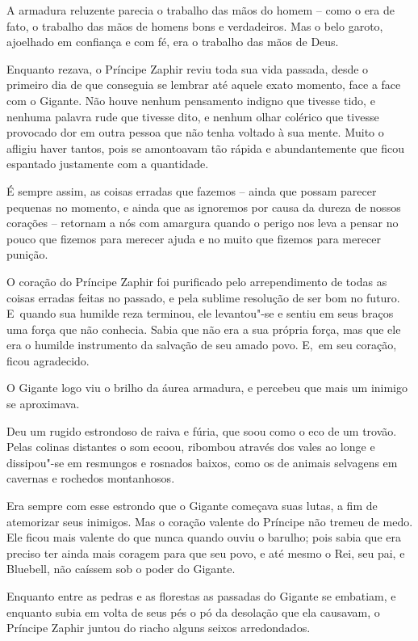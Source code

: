 A armadura reluzente parecia o trabalho das mãos do homem -- como o era de fato,
o trabalho das mãos de homens bons e verdadeiros. Mas o belo garoto,
ajoelhado em confiança e com fé, era o trabalho das mãos de Deus.

Enquanto rezava, o Príncipe Zaphir reviu toda sua vida passada, desde o
primeiro dia de que conseguia se lembrar até aquele exato momento, face
a face com o Gigante. Não houve nenhum pensamento indigno que tivesse
tido, e nenhuma palavra rude que tivesse dito, e nenhum olhar colérico
que tivesse provocado dor em outra pessoa que não tenha voltado à sua
mente. Muito o afligiu haver tantos, pois se amontoavam tão rápida e
abundantemente que ficou espantado justamente com a quantidade.

É sempre assim, as coisas erradas que fazemos -- ainda que possam
parecer pequenas no momento, e ainda que as ignoremos por causa da
dureza de nossos corações -- retornam a nós com amargura quando o
perigo nos leva a pensar no pouco que fizemos para merecer ajuda e no
muito que fizemos para merecer punição.

O coração do Príncipe Zaphir foi purificado pelo arrependimento de todas
as coisas erradas feitas no passado, e pela sublime resolução de ser bom
no futuro. E~quando sua humilde reza terminou, ele levantou"-se e sentiu
em seus braços uma força que não conhecia. Sabia que não era a sua
própria força, mas que ele era o humilde instrumento da salvação de seu
amado povo. E,~em seu coração, ficou agradecido.

O Gigante logo viu o brilho da áurea armadura, e percebeu que mais um
inimigo se aproximava.

Deu um rugido estrondoso de raiva e fúria, que soou como o eco de um
trovão. Pelas colinas distantes o som ecoou, ribombou através dos vales
ao longe e dissipou"-se em resmungos e rosnados baixos, como os de
animais selvagens em cavernas e rochedos montanhosos.

Era sempre com esse estrondo que o Gigante começava suas lutas, a fim de
atemorizar seus inimigos. Mas o coração valente do Príncipe não tremeu
de medo. Ele ficou mais valente do que nunca quando ouviu o barulho;
pois sabia que era preciso ter ainda mais coragem para que seu povo, e
até mesmo o Rei, seu pai, e Bluebell, não caíssem sob o poder do Gigante.

Enquanto entre as pedras e as florestas as passadas do Gigante se embatiam,
e enquanto subia em volta de seus pés o pó da desolação que ela causavam, o
Príncipe Zaphir juntou do riacho alguns seixos arredondados.

